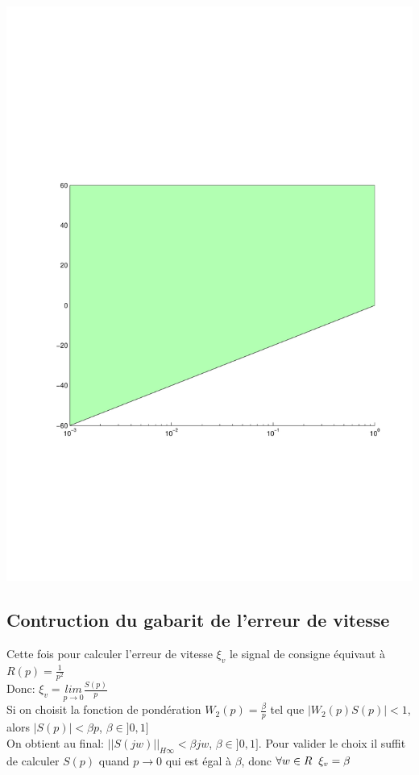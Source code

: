 \documentclass[12pt, a4paper, openany]{report}
\begin{document}
   \begin{center}
    \includegraphics[scale=0.5]{gabarit1.pdf}
    \label{fig4}
  \end{center}
   
  \subsection{Contruction du gabarit de l'erreur de vitesse}
  
  Cette fois pour calculer l'erreur de vitesse $\xi_{v}$ le signal de consigne équivaut à $R(p)=\frac{1}{p^{2}}$\\[0.75cm]
  Donc: \hspace{5mm} $\xi_{v}=\underset{p\longrightarrow 0}{lim}\frac{S(p)}{p}$\\[0.75cm]
  Si on choisit la fonction de pondération $W_{2}(p)=\frac{\beta}{p}$ tel que $|W_{2}(p)S(p)|<1$, alors $|S(p)|<\beta p$, $\beta \in ]0, 1]$\\[0.75cm]
  On obtient au final: \hspace{5mm} $||S(jw)||_{H\infty}<\beta jw$, $\beta \in ]0, 1]$. Pour valider le choix il suffit de calculer $S(p)$ quand $p\rightarrow0$ qui est égal à $\beta$, donc $\forall w \in R \hspace{2mm} \xi_{v}=\beta$ 
  
\end{document}
